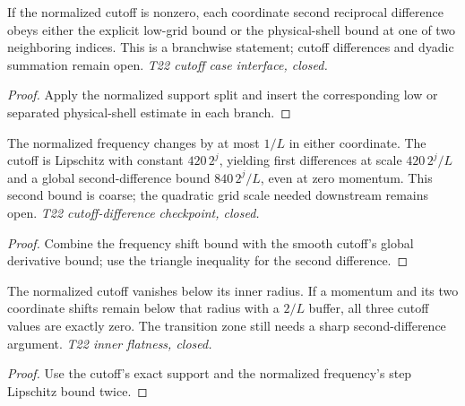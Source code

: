 \begin{lemma}
  \label{lem:normalized-cutoff-second-diff}
  \leanok
  If the normalized cutoff is nonzero, each coordinate second reciprocal
  difference obeys either the explicit low-grid bound or the physical-shell
  bound at one of two neighboring indices. This is a branchwise statement;
  cutoff differences and dyadic summation remain open.
  \emph{T22 cutoff case interface, closed.}
\end{lemma}
\begin{proof}\leanok
  Apply the normalized support split and insert the corresponding low or
  separated physical-shell estimate in each branch.
\end{proof}

\begin{lemma}
  \label{lem:normalized-cutoff-diff}
  \leanok
  The normalized frequency changes by at most $1/L$ in either coordinate.
  The cutoff is Lipschitz with constant $420\,2^j$, yielding first
  differences at scale $420\,2^j/L$ and a global second-difference bound
  $840\,2^j/L$, even at zero momentum. This second bound is coarse; the
  quadratic grid scale needed downstream remains open.
  \emph{T22 cutoff-difference checkpoint, closed.}
\end{lemma}
\begin{proof}\leanok
  Combine the frequency shift bound with the smooth cutoff's global
  derivative bound; use the triangle inequality for the second difference.
\end{proof}

\begin{lemma}
  \label{lem:normalized-cutoff-flat}
  \leanok
  The normalized cutoff vanishes below its inner radius. If a momentum and
  its two coordinate shifts remain below that radius with a $2/L$ buffer,
  all three cutoff values are exactly zero. The transition zone still needs
  a sharp second-difference argument. \emph{T22 inner flatness, closed.}
\end{lemma}
\begin{proof}\leanok
  Use the cutoff's exact support and the normalized frequency's step
  Lipschitz bound twice.
\end{proof}

